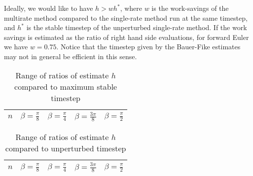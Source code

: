 \documentclass[10pt]{article}
\begin{document}
Ideally, we would like to have $h > wh^*$, where $w$ is the work-savings
of the multirate method compared to the single-rate method run at the
same timestep, and $h^*$ is the stable timestep of the unperturbed
single-rate method. If the work savings is estimated as the ratio of
right hand side evaluations, for forward Euler we have $w =
0.75$. Notice that the timestep given by the Bauer-Fike estimates may
not in general be efficient in this sense.

\begin{table}
\centering
\begin{tabular}{lllll}
$n$ & $\beta = \frac{\pi}{8}$ & $\beta = \frac{\pi}{4}$ &
  $\beta=\frac{3\pi}{8}$ & $\beta=\frac{\pi}{2}$ \\
\hline

\end{tabular}
\caption{Range of ratios of estimate $h$ compared to maximum stable
  timestep\label{table:h-to-computed}}
\end{table}

\begin{table}
\centering
\begin{tabular}{lllll}
$n$ & $\beta = \frac{\pi}{8}$ & $\beta = \frac{\pi}{4}$ &
  $\beta=\frac{3\pi}{8}$ & $\beta=\frac{\pi}{2}$ \\
\hline

\end{tabular}
\caption{Range of ratios of estimate $h$ compared to unperturbed
  timestep\label{table:h-to-unperturbed}}
\end{table}
\end{document}
